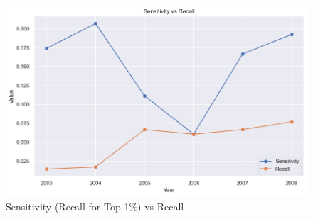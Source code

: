 \documentclass[conference]{IEEEtran}
\begin{document}
					\begin{figure}[H]
	\centerline{\includegraphics[width=\columnwidth]{output5}}
	\caption{Sensitivity (Recall for Top 1\%) vs Recall}
	\label{fig}
	\end{figure} \vspace{15pt}
\end{document}
